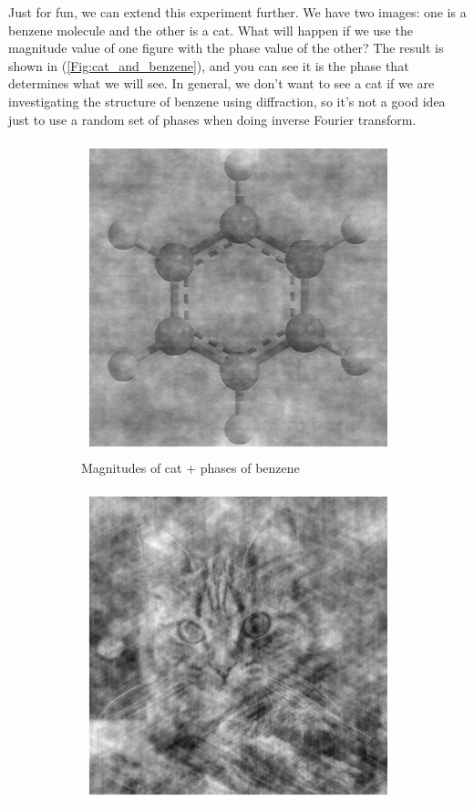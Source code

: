 \documentclass{article}
\theoremstyle{plain}\theoremheaderfont{\normalfont\itshape}\theorembodyfont{\rmfamily}\theoremseparator{.}\newtheorem*{rem}{Remark}\newtheorem*{ex}{Example}\newtheorem*{proof}{Proof}\newtheorem*{altp}{Alternative proof}
\theoremstyle{plain}\theoremheaderfont{\normalfont\bfseries}\theorembodyfont{\rmfamily}\theoremseparator{.}\newtheorem{thm}{Theorem}[section]\newtheorem{lem}[thm]{Lemma}\newtheorem{prop}[thm]{Proposition}\newtheorem*{cor}{Corollary}\newtheorem{defn}[thm]{Definition}\newtheorem{clm}[thm]{Claim}\newtheorem{clminproof}{Claim}\newtheorem*{law}{Law}\newtheorem{pos}[thm]{Postulate}
\theoremstyle{break}\theoremheaderfont{\normalfont\itshape}\theorembodyfont{\rmfamily}\theoremseparator{.\medskip}\newtheorem*{proofskip}{Proof}\newtheorem*{exs}{Examples}\newtheorem*{rems}{Remarks}
\theoremstyle{break}\theoremheaderfont{\normalfont\bfseries}\theorembodyfont{\rmfamily}\theoremseparator{.\medskip}\newtheorem{lemskip}[thm]{Lemma}\newtheorem{defnskip}[thm]{Definition}\newtheorem{propskip}[thm]{Proposition}\newtheorem{thmskip}[thm]{Theorem}
\numberwithin{equation}{section}
\begin{document}
    Just for fun, we can extend this experiment further. We have two images: one is a benzene molecule and the other is a cat. What will happen if we use the magnitude value of one figure with the phase value of the other? The result is shown in (\ref{Fig:cat_and_benzene}), and you can see it is the phase that determines what we will see. In general, we don't want to see a cat if we are investigating the structure of benzene using diffraction, so it's not a good idea just to use a random set of phases when doing inverse Fourier transform.
    \begin{figure}[ht!]
        \begin{subfigure}[h]{0.45\linewidth}
            \centering
            \includegraphics[width=0.8\linewidth]{cat_with_ben.png}
            \caption{Magnitudes of cat + phases of benzene}
        \end{subfigure}
        \hfill
        \begin{subfigure}[h]{0.45\linewidth}
            \centering
            \includegraphics[width=0.8\linewidth]{ben_with_cat.png}

\end{subfigure}
\end{figure}
\end{document}
